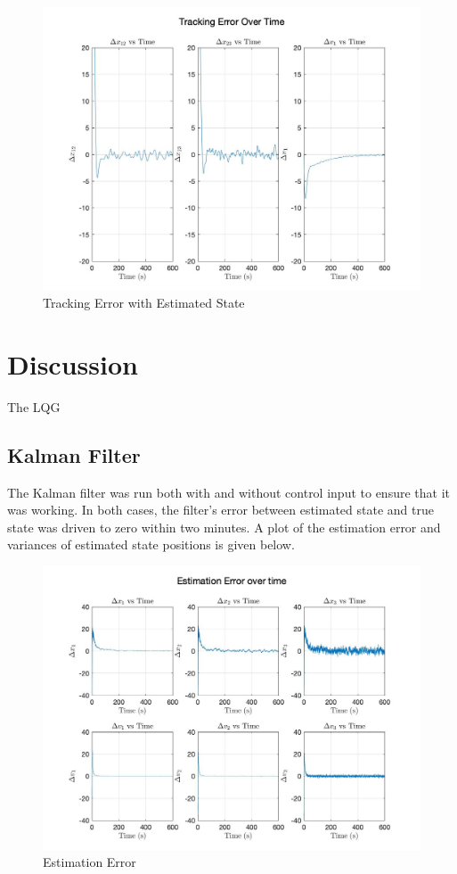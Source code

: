 \documentclass[12pt,onecolumn,reqno]{amsart}
\begin{document}
\begin{figure}[H]
	\includegraphics[width=\linewidth]{tracking_error_over_time.jpg}
	\caption{Tracking Error with Estimated State}
	\label{fig:Tracking Error with Kalman Filter}
\end{figure}


\section{Discussion}
The LQG 

\subsection{Kalman Filter}
The Kalman filter was run both with and without control input to ensure that it
was working. In both cases, the filter's error between estimated state and true
state was driven to zero within two minutes. A plot of the estimation error and
variances of estimated state positions is given below. 

\begin{figure}[H]
	\includegraphics[width=\linewidth]{estimation_error_over_time.jpg}
	\caption{Estimation Error}
	\label{fig:Est. Error}
\end{figure}
\end{document}
